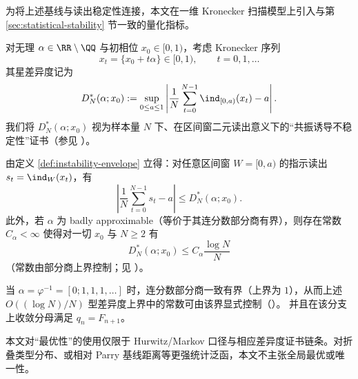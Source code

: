 为将上述基线与读出稳定性连接，本文在一维 Kronecker 扫描模型上引入与第 \ref{sec:statistical-stability} 节一致的量化指标。

\begin{definition}\label{def:instability-envelope}
对无理 $\alpha\in\RR\setminus\QQ$ 与初相位 $x_0\in[0,1)$，考虑 Kronecker 序列
\[
x_t=\{x_0+t\alpha\}\in[0,1),\qquad t=0,1,\dots
\]
其星差异度记为
\[
D_N^*(\alpha;x_0):=\sup_{0\le a\le 1}\left|\frac1N\sum_{t=0}^{N-1}\ind_{[0,a)}(x_t)-a\right|.
\]
我们将 $D_N^*(\alpha;x_0)$ 视为样本量 $N$ 下、在区间窗二元读出意义下的“共振诱导不稳定性”证书（参见 \cite{KuipersNiederreiter1974}）。
\end{definition}

由定义 \ref{def:instability-envelope} 立得：对任意区间窗 $W=[0,a)$ 的指示读出 $s_t=\ind_W(x_t)$，有
\[
\left|\frac1N\sum_{t=0}^{N-1}s_t-a\right|\le D_N^*(\alpha;x_0).
\]
此外，若 \(\alpha\) 为 badly approximable（等价于其连分数部分商有界），则存在常数 \(C_\alpha<\infty\) 使得对一切 \(x_0\) 与 \(N\ge 2\) 有
\[
D_N^*(\alpha;x_0)\le C_\alpha\frac{\log N}{N}
\]
（常数由部分商上界控制；见 \cite{KuipersNiederreiter1974}）。

\begin{corollary}[黄金分支的星差异证书可审计化]\label{cor:golden-branch-star-discrepancy-audit}
当 \(\alpha=\varphi^{-1}=[0;1,1,1,\dots]\) 时，连分数部分商一致有界（上界为 \(1\)），从而上述 \(O((\log N)/N)\) 型差异度上界中的常数可由该界显式控制（\cite{KuipersNiederreiter1974}）。
并且在该分支上收敛分母满足 \(q_n=F_{n+1}\)。
\end{corollary}

\begin{remark}\label{rem:what-is-optimized}
本文对“最优性”的使用仅限于 Hurwitz/Markov 口径与相应差异度证书链条。对折叠类型分布、或相对 Parry 基线距离等更强统计泛函，本文不主张全局最优或唯一性。
\end{remark}
